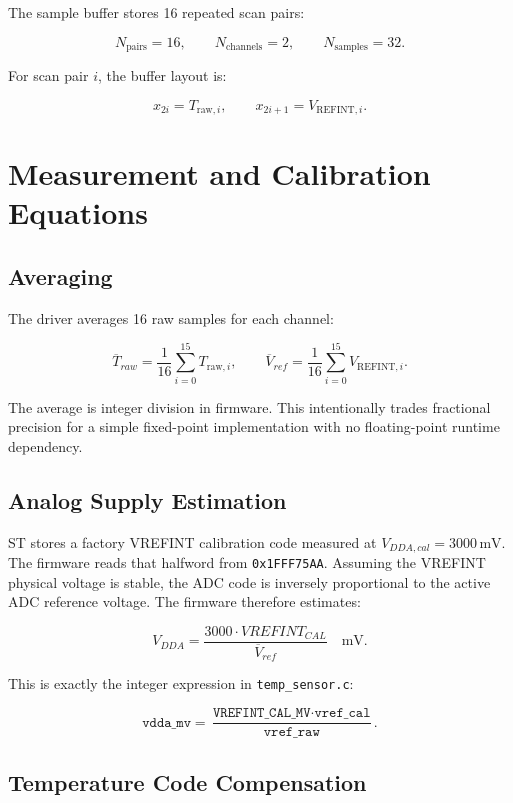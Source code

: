 \documentclass[11pt,a4paper]{article}
\begin{document}
The sample buffer stores 16 repeated scan pairs:

\[
N_{\mathrm{pairs}} = 16,\qquad
N_{\mathrm{channels}} = 2,\qquad
N_{\mathrm{samples}} = 32.
\]

For scan pair \(i\), the buffer layout is:

\[
x_{2i} = T_{\mathrm{raw},i},\qquad
x_{2i+1} = V_{\mathrm{REFINT},i}.
\]

\section{Measurement and Calibration Equations}

\subsection{Averaging}

The driver averages 16 raw samples for each channel:

\[
\overline{T}_{raw}
  = \frac{1}{16}\sum_{i=0}^{15}T_{\mathrm{raw},i},
\qquad
\overline{V}_{ref}
  = \frac{1}{16}\sum_{i=0}^{15}V_{\mathrm{REFINT},i}.
\]

The average is integer division in firmware. This intentionally trades fractional
precision for a simple fixed-point implementation with no floating-point runtime
dependency.

\subsection{Analog Supply Estimation}

ST stores a factory VREFINT calibration code measured at
\(V_{DDA,cal}=3000\,\mathrm{mV}\). The firmware reads that halfword from
\texttt{0x1FFF75AA}. Assuming the VREFINT physical voltage is stable, the ADC
code is inversely proportional to the active ADC reference voltage. The firmware
therefore estimates:

\[
V_{DDA}
  = \frac{3000 \cdot VREFINT_{CAL}}{\overline{V}_{ref}}
  \quad\mathrm{mV}.
\]

This is exactly the integer expression in \texttt{temp\_sensor.c}:

\[
\texttt{vdda\_mv}
  = \frac{\texttt{VREFINT\_CAL\_MV} \cdot \texttt{vref\_cal}}
         {\texttt{vref\_raw}}.
\]

\subsection{Temperature Code Compensation}
\end{document}
